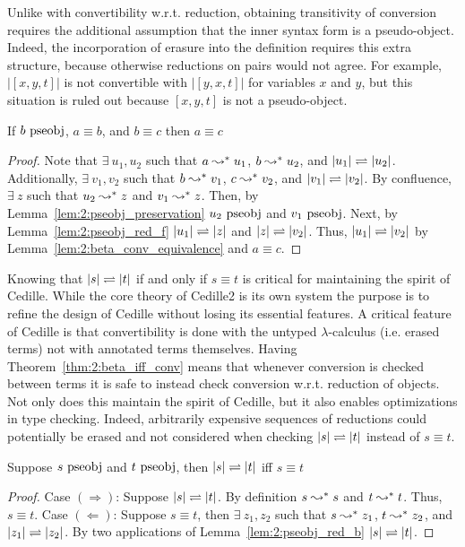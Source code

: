 Unlike with convertibility w.r.t. reduction, obtaining transitivity of conversion requires the additional assumption that the inner syntax form is a pseudo-object.
Indeed, the incorporation of erasure into the definition requires this extra structure, because otherwise reductions on pairs would not agree.
For example, $|[x, y, t]|$ is not convertible with $|[y, x, t]|$ for variables $x$ and $y$, but this situation is ruled out because $[x, y, t]$ is not a pseudo-object.

\begin{theorem}
    If $b~\mbox{\normalfont pseobj}$, $a \equiv b$, and $b \equiv c$ then $a \equiv c$
    \label{thm:2:conv_trans}
\end{theorem}
\begin{proof}
    Note that $\exists\ u_1, u_2$ such that $a \leadsto^* u_1$, $b \leadsto^* u_2$, and $|u_1| \rightleftharpoons |u_2|$.
    Additionally, $\exists\ v_1, v_2$ such that $b \leadsto^* v_1$, $c \leadsto^* v_2$, and $|v_1| \rightleftharpoons |v_2|$.
    By confluence, $\exists\ z$ such that $u_2 \leadsto^* z$ and $v_1 \leadsto^* z$.
    Then, by Lemma~\ref{lem:2:pseobj_preservation} $u_2~\mbox{\normalfont pseobj}$ and $v_1~\mbox{\normalfont pseobj}$.
    Next, by Lemma~\ref{lem:2:pseobj_red_f} $|u_1| \rightleftharpoons |z|$ and $|z| \rightleftharpoons |v_2|$.
    Thus, $|u_1| \rightleftharpoons |v_2|$ by Lemma~\ref{lem:2:beta_conv_equivalence} and $a \equiv c$.
\end{proof}

Knowing that $|s| \rightleftharpoons |t|$ if and only if $s \equiv t$ is critical for maintaining the spirit of Cedille.
While the core theory of Cedille2 is its own system the purpose is to refine the design of Cedille without losing its essential features.
A critical feature of Cedille is that convertibility is done with the untyped $\lambda$-calculus (i.e. erased terms) not with annotated terms themselves.
Having Theorem~\ref{thm:2:beta_iff_conv} means that whenever conversion is checked between terms it is safe to instead check conversion w.r.t. reduction of objects.
Not only does this maintain the spirit of Cedille, but it also enables optimizations in type checking.
Indeed, arbitrarily expensive sequences of reductions could potentially be erased and not considered when checking $|s| \rightleftharpoons |t|$ instead of $s \equiv t$.

\begin{theorem}
    Suppose $s~\mbox{\normalfont pseobj}$ and $t~\mbox{\normalfont pseobj}$, then $|s| \rightleftharpoons |t|$ iff $s \equiv t$
    \label{thm:2:beta_iff_conv}
\end{theorem}
\begin{proof}
    Case $(\Rightarrow)$:
    Suppose $|s| \rightleftharpoons |t|$.
    By definition $s \leadsto^* s$ and $t \leadsto^* t$.
    Thus, $s \equiv t$.
    Case $(\Leftarrow)$:
    Suppose $s \equiv t$, then $\exists\ z_1, z_2$ such that $s \leadsto^* z_1$, $t \leadsto^* z_2$, and $|z_1| \rightleftharpoons |z_2|$.
    By two applications of Lemma~\ref{lem:2:pseobj_red_b} $|s| \rightleftharpoons |t|$.
\end{proof}

